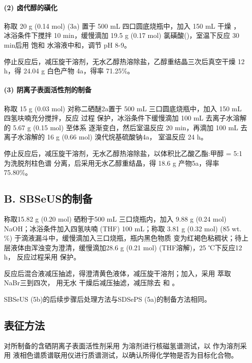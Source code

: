 \documentclass[bachelor,winfonts,replaceperiod]{jnuthesis}
\begin{document}
    \paragraph*{(2) 卤代醇的磺化}
    称取 20 g (0.14 mol)  (3a) 置于 500 mL 四口圆底烧瓶中，加入 150 mL 干燥 ，
    冰浴条件下搅拌 10 min，缓慢滴加 19.5 g (0.17 mol) 氯磺酸()，室温下反应 30 min后用
    饱和 水溶液中和，调节 pH 8-9。
    
    停止反应后，减压旋干溶剂，无水乙醇热溶除盐，乙醇重结晶三次后真空干燥 12 h，得 24.04 g 白色产物
    4a，得率 71.25\%。
    
    \paragraph*{(3) 阴离子表面活性剂的制备}
    称取 15 g (0.03 mol) 对称二硒醚2a置于 500 mL 三口圆底烧瓶中，加入 150 mL 四氢呋喃充分搅拌，反应
    过程  保护，冰浴条件下缓慢滴加 100 mL 去离子水溶解的 5.67 g (0.15 mol) 至体系
    逐渐变白，然后室温反应 20 min，再滴加 100 mL 去离子水溶解的 16 g (0.66 mol) 溴代烷基硫酸钠4a，
    室温反应 24 h。
    
    停止反应后，减压旋干溶剂，无水乙醇热溶除盐，以体积比乙酸乙酯:甲醇 = 5:1 为洗脱剂柱色谱
    分离，后采用无水乙醇重结晶，得 18.6 g 产物5a，得率 75.80\%。
    \subsection*{B. SBSeUS的制备}
    称取15.82 g (0.20 mol) 硒粉于500 mL 三口烧瓶内，加入 9.88 g (0.24 mol) NaOH；冰浴条件加入四氢呋喃 (THF)
    100 mL；称取 3.81 g (0.32 mol)  (85 wt. \%) 于滴液漏斗中，缓慢滴加入三口烧瓶，瓶内黑色物质
    变为红褐色粘稠状；待上层液体由浑浊变为澄清，缓慢滴加28.6 g (0.21 mol)  (THF溶解)，25 ℃下反应12 h，
    反应过程采用  保护。
    
    反应后混合液减压抽滤，得澄清黄色液体，减压旋干溶剂；加入，采用  萃取 NaBr三到四次，
    用无水  干燥后减压抽滤，减压除去  和 。
    
    SBSeUS (5b)的后续步骤后处理方法与SDSePS (5a)的制备方法相同。
    
    \subsection{表征方法}
    对所制备的含硒阴离子表面活性剂采用 为溶剂进行核磁氢谱测试，以 作为溶剂采用
    液相色谱质谱联用仪进行质谱测试，以确认所得化学物是否为目标化合物。
    
\end{document}
